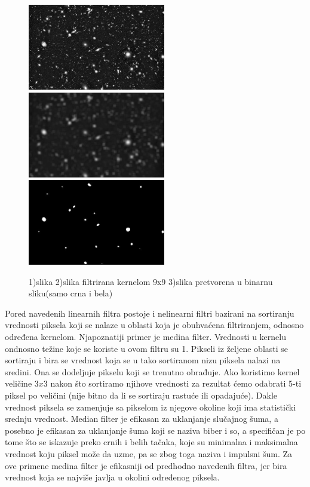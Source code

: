 \documentclass[a4paper,12pt,titlepage]{article}
\begin{document}
\begin{figure}[ht!]
\centering
\includegraphics[width=60mm]{img/tel.jpg}
\includegraphics[width=60mm]{img/telAvg.jpg}
\includegraphics[width=60mm]{img/telTh.jpg}
\caption{1)slika 2)slika filtrirana kernelom 9x9 3)slika pretvorena u binarnu sliku(samo crna i bela)}
\label{overflow}
\end{figure}

Pored navedenih linearnih filtra postoje i nelinearni filtri bazirani na sortiranju vrednosti piksela koji se nalaze u oblasti koja je obuhvaćena filtriranjem, odnosno određena kernelom. Njapoznatiji primer je medina filter. Vrednosti u kernelu ondnosno težine koje se koriste u ovom filtru su 1. Pikseli iz željene oblasti se sortiraju i bira se vrednost koja se u tako sortiranom nizu piksela nalazi na sredini. Ona se dodeljuje pikselu koji se trenutno obrađuje. Ako koristimo kernel veličine $3 x 3$ nakon što sortiramo njihove vrednosti za rezultat ćemo odabrati 5-ti piksel po veličini (nije bitno da li se sortiraju rastuće ili opadajuće). Dakle vrednost piksela se zamenjuje sa pikselom iz njegove okoline koji ima statistički srednju vrednost. Median filter je efikasan za uklanjanje slučajnog šuma, a posebno je efikasan za uklanjanje šuma koji se naziva biber i so, a specifičan je po tome što se iskazuje preko crnih i belih tačaka, koje su minimalna i maksimalna vrednost koju piksel može da uzme, pa se zbog toga naziva i impulsni šum. Za ove primene medina filter je efikasniji od predhodno navedenih filtra, jer bira vrednost koja se najviše javlja u okolini određenog piksela.
\end{document}
